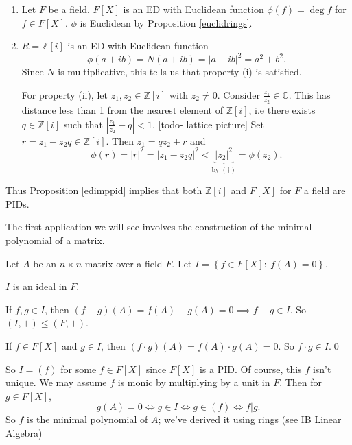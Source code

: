 \documentclass[egregdoesnotlikesansseriftitles,a4paper]{scrartcl}
\begin{document}
\begin{example*}
      \begin{enumerate}
            \item Let $F$ be a field. $F[X]$ is an ED with Euclidean function $\phi (f)=\operatorname{deg} f$ for $f \in F[X]$. $\phi$ is Euclidean by Proposition \ref{euclidrings}.
            \item $R=\mathbb{Z}[i]$ is an ED with Euclidean function \[
            \phi (a+ib )=N (a+ib)= \left|a+ib \right|^2 =a^2+b^2
            .\] Since $N$ is multiplicative, this tells us that property (i) is satisfied. 

            For property (ii), let $z_1 , z_2 \in \mathbb{Z}[i]$ with $z_2 \neq 0$. Consider $\frac{z_1}{z_2 } \in \mathbb{C}$. This has distance less than 1 from the nearest element of $\mathbb{Z}[i]$, i.e there exists $q \in \mathbb{Z}[i]$ such that $\left|\frac{z_1}{z_2 }-q\right|<1$.
            [todo- lattice picture] 
            Set $r=z_1 -z_2 q \in \mathbb{Z}[i]$. Then $z_1 =qz_2 +r$ and \[
            \phi (r)=\left|r\right|^2=\left|z_1 -z_2 q\right|^2< \underbrace{\left|z_2 \right|^2 }_{\text{by } (\dagger)} =\phi (z_2 )
            .\]
      \end{enumerate}
      Thus Proposition \ref{edimppid} implies that both $\mathbb{Z}[i]$ and $F[X]$ for $F$ a field are PIDs.
\end{example*}
The first application we will see involves the construction of the minimal polynomial of a matrix.
\begin{example*}
       Let $A$ be an $n \times n$ matrix over a field $F$. Let $I=\left\{f \in F[X]: \ f (A)=0\right\}$. 
       \begin{claim}
             $I$ is an ideal in $F$.
       \end{claim}
       \begin{prooff}
              If $f,g \in I$, then $(f-g)(A)=f (A)- g (A)=0 \implies f-g \in I$. So $(I,+)\leq (F,+)$. 
              
              If $f \in F[X]$ and $g \in I$, then $(f \cdot g)(A)=f (A)\cdot g (A)=0$. So $f \cdot g \in I$.\hfill \qed
       \end{prooff}
       So $I = (f)$ for some $f \in F[X]$ since $F[X]$ is a PID. Of course, this $f$ isn't unique. We may assume $f$ is monic by multiplying by a unit in $F$. Then for $g \in F[X]$, \[
            g (A)=0 \iff g \in I \iff g \in (f) \iff f|g
       .\] So $f$ is the minimal polynomial of $A$; we've derived it using rings (see IB Linear Algebra)
\end{example*}
\end{document}
